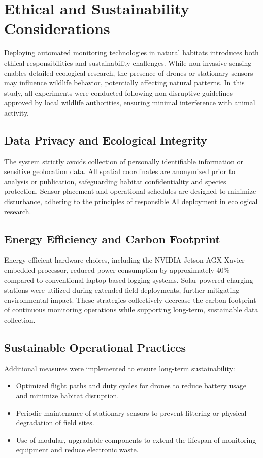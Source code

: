 \documentclass[conference]{IEEEtran}
\begin{document}
\section{Ethical and Sustainability Considerations}

Deploying automated monitoring technologies in natural habitats introduces both ethical responsibilities and sustainability challenges. While non-invasive sensing enables detailed ecological research, the presence of drones or stationary sensors may influence wildlife behavior, potentially affecting natural patterns. In this study, all experiments were conducted following non-disruptive guidelines approved by local wildlife authorities, ensuring minimal interference with animal activity.

\subsection{Data Privacy and Ecological Integrity}
The system strictly avoids collection of personally identifiable information or sensitive geolocation data. All spatial coordinates are anonymized prior to analysis or publication, safeguarding habitat confidentiality and species protection. Sensor placement and operational schedules are designed to minimize disturbance, adhering to the principles of responsible AI deployment in ecological research.

\subsection{Energy Efficiency and Carbon Footprint}
Energy-efficient hardware choices, including the NVIDIA Jetson AGX Xavier embedded processor, reduced power consumption by approximately 40\% compared to conventional laptop-based logging systems. Solar-powered charging stations were utilized during extended field deployments, further mitigating environmental impact. These strategies collectively decrease the carbon footprint of continuous monitoring operations while supporting long-term, sustainable data collection.

\subsection{Sustainable Operational Practices}
Additional measures were implemented to ensure long-term sustainability:  
\begin{itemize}
    \item Optimized flight paths and duty cycles for drones to reduce battery usage and minimize habitat disruption.  
    \item Periodic maintenance of stationary sensors to prevent littering or physical degradation of field sites.  
    \item Use of modular, upgradable components to extend the lifespan of monitoring equipment and reduce electronic waste.  
\end{itemize}
\end{document}
